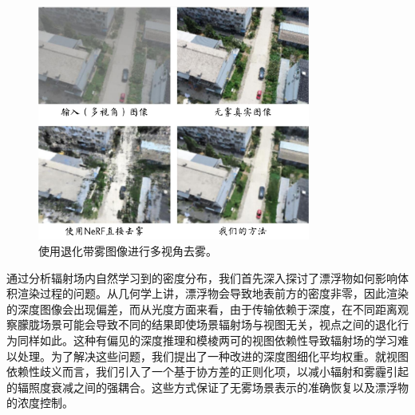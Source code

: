 \begin{figure}[ht]
    \centering
    \includegraphics[width=0.8\textwidth]{undergraduate-thesis/images/dehazing-nerf/teaser.pdf}
    \caption{使用退化带雾图像进行多视角去雾。}
    \label{fig:dehazing-nerf teaser}
\end{figure}

通过分析辐射场内自然学习到的密度分布，我们首先深入探讨了漂浮物如何影响体积渲染过程的问题。从几何学上讲，漂浮物会导致地表前方的密度非零，因此渲染的深度图像会出现偏差，而从光度方面来看，由于传输依赖于深度，在不同距离观察朦胧场景可能会导致不同的结果即使场景辐射场与视图无关，视点之间的退化行为同样如此。这种有偏见的深度推理和模棱两可的视图依赖性导致辐射场的学习难以处理。为了解决这些问题，我们提出了一种改进的深度图细化平均权重。就视图依赖性歧义而言，我们引入了一个基于协方差的正则化项，以减小辐射和雾霾引起的辐照度衰减之间的强耦合。这些方式保证了无雾场景表示的准确恢复以及漂浮物的浓度控制。

